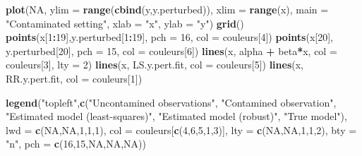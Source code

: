 \documentclass[]{book}
\newenvironment{Shaded}{\begin{snugshade}}{\end{snugshade}}
\newcommand{\KeywordTok}[1]{\textcolor[rgb]{0.13,0.29,0.53}{\textbf{#1}}}
\newcommand{\DataTypeTok}[1]{\textcolor[rgb]{0.13,0.29,0.53}{#1}}
\newcommand{\DecValTok}[1]{\textcolor[rgb]{0.00,0.00,0.81}{#1}}
\newcommand{\StringTok}[1]{\textcolor[rgb]{0.31,0.60,0.02}{#1}}
\newcommand{\OtherTok}[1]{\textcolor[rgb]{0.56,0.35,0.01}{#1}}
\newcommand{\OperatorTok}[1]{\textcolor[rgb]{0.81,0.36,0.00}{\textbf{#1}}}
\newcommand{\NormalTok}[1]{#1}
\theoremstyle{definition}
\theoremstyle{definition}
\theoremstyle{definition}
\theoremstyle{remark}
\begin{document}
\begin{Shaded}
\begin{Highlighting}[]
\KeywordTok{plot}\NormalTok{(}\OtherTok{NA}\NormalTok{, }\DataTypeTok{ylim =} \KeywordTok{range}\NormalTok{(}\KeywordTok{cbind}\NormalTok{(y,y.perturbed)), }\DataTypeTok{xlim =} \KeywordTok{range}\NormalTok{(x),}
     \DataTypeTok{main =} \StringTok{"Contaminated setting"}\NormalTok{, }\DataTypeTok{xlab =} \StringTok{"x"}\NormalTok{, }\DataTypeTok{ylab =} \StringTok{"y"}\NormalTok{)}
\KeywordTok{grid}\NormalTok{()}
\KeywordTok{points}\NormalTok{(x[}\DecValTok{1}\OperatorTok{:}\DecValTok{19}\NormalTok{],y.perturbed[}\DecValTok{1}\OperatorTok{:}\DecValTok{19}\NormalTok{], }\DataTypeTok{pch =} \DecValTok{16}\NormalTok{, }\DataTypeTok{col =}\NormalTok{ couleurs[}\DecValTok{4}\NormalTok{])}
\KeywordTok{points}\NormalTok{(x[}\DecValTok{20}\NormalTok{], y.perturbed[}\DecValTok{20}\NormalTok{], }\DataTypeTok{pch =} \DecValTok{15}\NormalTok{, }\DataTypeTok{col =}\NormalTok{ couleurs[}\DecValTok{6}\NormalTok{])}
\KeywordTok{lines}\NormalTok{(x, alpha }\OperatorTok{+}\StringTok{ }\NormalTok{beta}\OperatorTok{*}\NormalTok{x, }\DataTypeTok{col =}\NormalTok{ couleurs[}\DecValTok{3}\NormalTok{], }\DataTypeTok{lty =} \DecValTok{2}\NormalTok{)}
\KeywordTok{lines}\NormalTok{(x, LS.y.pert.fit, }\DataTypeTok{col =}\NormalTok{ couleurs[}\DecValTok{5}\NormalTok{])}
\KeywordTok{lines}\NormalTok{(x, RR.y.pert.fit, }\DataTypeTok{col =}\NormalTok{ couleurs[}\DecValTok{1}\NormalTok{])}

\KeywordTok{legend}\NormalTok{(}\StringTok{"topleft"}\NormalTok{,}\KeywordTok{c}\NormalTok{(}\StringTok{"Uncontamined observations"}\NormalTok{, }\StringTok{"Contamined observation"}\NormalTok{,}
                   \StringTok{"Estimated model (least-squares)"}\NormalTok{, }\StringTok{"Estimated model (robust)"}\NormalTok{,}
                   \StringTok{"True model"}\NormalTok{), }\DataTypeTok{lwd =} \KeywordTok{c}\NormalTok{(}\OtherTok{NA}\NormalTok{,}\OtherTok{NA}\NormalTok{,}\DecValTok{1}\NormalTok{,}\DecValTok{1}\NormalTok{,}\DecValTok{1}\NormalTok{), }\DataTypeTok{col =}\NormalTok{ couleurs[}\KeywordTok{c}\NormalTok{(}\DecValTok{4}\NormalTok{,}\DecValTok{6}\NormalTok{,}\DecValTok{5}\NormalTok{,}\DecValTok{1}\NormalTok{,}\DecValTok{3}\NormalTok{)],}
       \DataTypeTok{lty =} \KeywordTok{c}\NormalTok{(}\OtherTok{NA}\NormalTok{,}\OtherTok{NA}\NormalTok{,}\DecValTok{1}\NormalTok{,}\DecValTok{1}\NormalTok{,}\DecValTok{2}\NormalTok{), }\DataTypeTok{bty =} \StringTok{"n"}\NormalTok{, }\DataTypeTok{pch =} \KeywordTok{c}\NormalTok{(}\DecValTok{16}\NormalTok{,}\DecValTok{15}\NormalTok{,}\OtherTok{NA}\NormalTok{,}\OtherTok{NA}\NormalTok{,}\OtherTok{NA}\NormalTok{))}
\end{Highlighting}
\end{Shaded}
\end{document}
